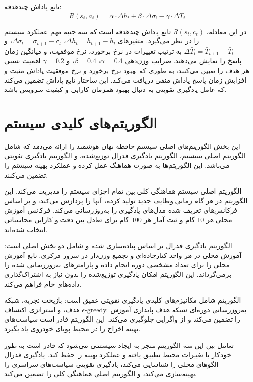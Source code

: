 \documentclass[11pt]{article}
\begin{document}
تابع پاداش چندهدفه:
\begin{equation}
R(s_t, a_t) = \alpha \cdot \Delta h_t + \beta \cdot \Delta \sigma_t - \gamma \cdot \Delta \bar{T}_t
\label{eq:reward_function}
\end{equation}

در این معادله، $R(s_t, a_t)$ تابع پاداش چندهدفه است که سه جنبه مهم عملکرد سیستم را در نظر می‌گیرد. متغیرهای $\Delta h_t = h_{t+1} - h_t$، $\Delta \sigma_t = \sigma_{t+1} - \sigma_t$، و $\Delta \bar{T}_t = \bar{T}_{t+1} - \bar{T}_t$ به ترتیب تغییرات در نرخ برخورد، نرخ موفقیت، و میانگین زمان پاسخ را نمایش می‌دهند. ضرایب وزن‌دهی $\alpha = 0.4$، $\beta = 0.4$، و $\gamma = 0.2$ اهمیت نسبی هر هدف را تعیین می‌کنند، به طوری که بهبود نرخ برخورد و نرخ موفقیت پاداش مثبت و افزایش زمان پاسخ پاداش منفی دریافت می‌کند. این ساختار تابع پاداش تضمین می‌کند که عامل یادگیری تقویتی به دنبال بهبود همزمان کارایی و کیفیت سرویس باشد.

\section{الگوریتم‌های کلیدی سیستم}

این بخش الگوریتم‌های اصلی سیستم حافظه نهان هوشمند را ارائه می‌دهد که شامل الگوریتم اصلی سیستم، الگوریتم یادگیری فدرال توزیع‌شده، و الگوریتم یادگیری تقویتی  می‌باشد. این الگوریتم‌ها به صورت هماهنگ عمل کرده و عملکرد بهینه سیستم را تضمین می‌کنند.

الگوریتم اصلی سیستم هماهنگی کلی بین تمام اجزای سیستم را مدیریت می‌کند. این الگوریتم در هر گام زمانی وظایف جدید تولید کرده، آنها را پردازش می‌کند، و بر اساس فرکانس‌های تعریف شده مدل‌های یادگیری را به‌روزرسانی می‌کند. فرکانس آموزش محلی هر 10 گام و ثبت آمار هر 100 گام برای تعادل بین دقت و کارایی محاسباتی انتخاب شده‌اند.

الگوریتم یادگیری فدرال بر اساس  پیاده‌سازی شده و شامل دو بخش اصلی است: آموزش محلی در هر واحد کنارجاده‌ای و تجمیع وزن‌دار در سرور مرکزی. تابع  آموزش محلی را برای تعداد مشخصی دوره انجام داده و پارامترهای به‌روزرسانی شده را برمی‌گرداند. این الگوریتم امکان یادگیری توزیع‌شده را بدون نیاز به اشتراک‌گذاری داده‌های خام فراهم می‌کند.

الگوریتم  شامل مکانیزم‌های کلیدی یادگیری تقویتی عمیق است: بازپخت تجربه، شبکه هدف، و استراتژی اکتشاف $\epsilon$-greedy. به‌روزرسانی دوره‌ای شبکه هدف پایداری آموزش را تضمین می‌کند و از واگرایی جلوگیری می‌کند. این الگوریتم قادر است سیاست‌های بهینه اخراج را در محیط پویای خودروی یاد بگیرد.

تعامل بین این سه الگوریتم منجر به ایجاد سیستمی می‌شود که قادر است به طور خودکار با تغییرات محیط تطبیق یافته و عملکرد بهینه را حفظ کند. یادگیری فدرال الگوهای محلی را شناسایی می‌کند، یادگیری تقویتی سیاست‌های سراسری را بهینه‌سازی می‌کند، و الگوریتم اصلی هماهنگی کلی را تضمین می‌کند.
\end{document}
